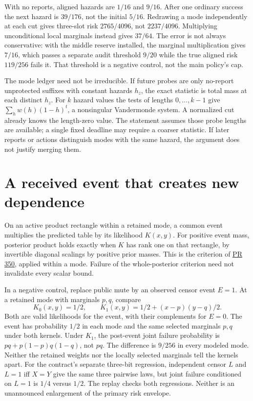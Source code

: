 \documentclass[11pt]{article}
\begin{document}
With no reports, aligned hazards are $1/16$ and $9/16$. After one ordinary success the next hazard is $39/176$, not the initial $5/16$. Redrawing a mode independently at each cut gives three-slot risk $2765/4096$, not $2237/4096$. Multiplying unconditional local marginals instead gives $37/64$. The error is not always conservative: with the middle reserve installed, the marginal multiplication gives $7/16$, which passes a separate audit threshold $9/20$ while the true aligned risk $119/256$ fails it. That threshold is a negative control, not the main policy's cap.

The mode ledger need not be irreducible. If future probes are only no-report unprotected suffixes with constant hazards $h_z$, the exact statistic is total mass at each distinct $h_z$. For $k$ hazard values the tests of lengths $0,\ldots,k-1$ give $\sum_h w(h)(1-h)^t$, a nonsingular Vandermonde system. A normalized cut already knows the length-zero value. The statement assumes those probe lengths are available; a single fixed deadline may require a coarser statistic. If later reports or actions distinguish modes with the same hazard, the argument does not justify merging them.

\section{A received event that creates new dependence}
On an active product rectangle within a retained mode, a common event multiplies the predicted table by its likelihood $K(x,y)$. For positive event mass, posterior product holds exactly when $K$ has rank one on that rectangle, by invertible diagonal scalings by positive prior masses. This is the criterion of \href{https://github.com/eternal-november/eos-research-programmes/pull/350}{PR 350}, applied within a mode. Failure of the whole-posterior criterion need not invalidate every scalar bound.

In a negative control, replace public mute by an observed censor event $E=1$. At a retained mode with marginals $p,q$, compare
\[
 K_0(x,y)=1/2,\qquad K_1(x,y)=1/2+(x-p)(y-q)/2.
\]
Both are valid likelihoods for the event, with their complements for $E=0$. The event has probability $1/2$ in each mode and the same selected marginals $p,q$ under both kernels. Under $K_1$, the post-event joint failure probability is $pq+p(1-p)q(1-q)$, not $pq$. The difference is $9/256$ in every modeled mode. Neither the retained weights nor the locally selected marginals tell the kernels apart. For the contract's separate three-bit regression, independent censor $L$ and $L=1$ iff $X=Y$ give the same three pairwise laws, but joint failure conditioned on $L=1$ is $1/4$ versus $1/2$. The replay checks both regressions. Neither is an unannounced enlargement of the primary risk envelope.
\end{document}
